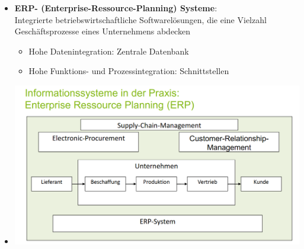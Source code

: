 \documentclass[12pt,a4paper]{article}
\begin{document}
\begin{itemize}
   \item \textbf{ERP- (Enterprise-Ressource-Planning) Systeme}:\\
         Integrierte betriebswirtschaftliche Softwarelösungen, die eine Vielzahl Ge\-schäfts\-pro\-zes\-se eines Unternehmens abdecken
      \begin{itemize}
			\item Hohe Datenintegration: Zentrale Datenbank
			\item Hohe Funktions- und Prozessintegration: Schnittstellen
      \end{itemize}
   \item[] \includegraphics[scale=0.35]{digi_pic.png}
\end{itemize}
\end{document}

